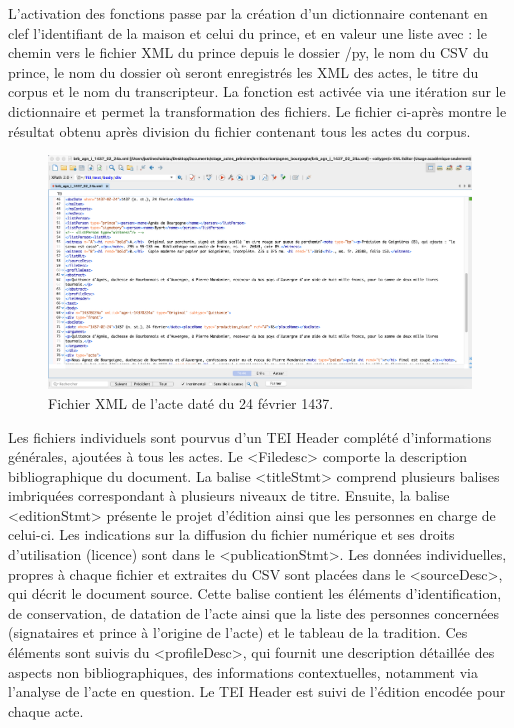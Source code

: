 \par L'activation des fonctions passe par la création d'un dictionnaire contenant en clef l'identifiant de la maison et celui du prince, et en valeur une liste avec : le chemin vers le fichier XML du prince depuis le dossier /py, le nom du CSV du prince, le nom du dossier où seront enregistrés les XML des actes, le titre du corpus et le nom du transcripteur. La fonction est activée via une itération sur le dictionnaire et permet la transformation des fichiers. Le fichier ci-après montre le résultat obtenu après division du fichier contenant tous les actes du corpus. 
\newline 

\begin{figure}[H]
    \centering
    \includegraphics[scale=0.31]{img/fichier_indiv.png}
    \caption{Fichier XML de l'acte daté du 24 février 1437.}
    \label{fig:fichier_indiv}
\end{figure}
\newpage 

\par Les fichiers individuels sont pourvus d'un TEI Header complété d'informations générales, ajoutées à tous les actes. Le <Filedesc> comporte la description bibliographique du document. La balise <titleStmt> comprend plusieurs balises imbriquées correspondant à plusieurs niveaux de titre. Ensuite, la balise <editionStmt> présente le projet d'édition ainsi que les personnes en charge de celui-ci. Les indications sur la diffusion du fichier numérique et ses droits d’utilisation (licence) sont dans le <publicationStmt>. Les données individuelles, propres à chaque fichier et extraites du CSV sont placées dans le <sourceDesc>, qui décrit le document source. Cette balise contient les éléments d'identification, de conservation, de datation de l'acte ainsi que la liste des personnes concernées (signataires et prince à l'origine de l'acte) et le tableau de la tradition. Ces éléments sont suivis du <profileDesc>, qui fournit une description détaillée des aspects non bibliographiques, des informations contextuelles, notamment via l'analyse de l'acte en question. Le TEI Header est suivi de l'édition encodée pour chaque acte. 
\newline 

